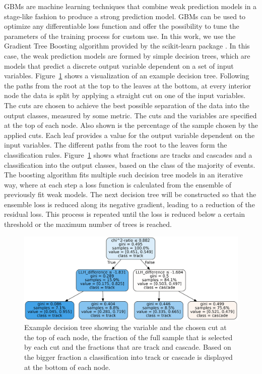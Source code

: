 GBMs are machine learning techniques that combine weak prediction models in a stage-like fashion to produce a strong prediction model.
GBMs can be used to optimize any differentiable loss function and offer the possibility to tune the parameters of the training process for custom use.
In this work, we use the Gradient Tree Boosting algorithm provided by the scikit-learn package \cite{scikit-learn}.
In this case, the weak prediction models are formed by simple decision trees, which are models that predict a discrete output variable dependent on a set of input variables.
Figure~\ref{fig:example_decision_tree} shows a visualization of an example decision tree.
Following the paths from the root at the top to the leaves at the bottom, at every interior node the data is split by applying a straight cut on one of the input variables.
The cuts are chosen to achieve the best possible separation of the data into the output classes, measured by some metric.
The cuts and the variables are specified at the top of each node.
Also shown is the percentage of the sample chosen by the applied cuts.
Each leaf provides a value for the output variable dependent on the input variables.
The different paths from the root to the leaves form the classification rules.
Figure~\ref{fig:example_decision_tree} shows what fractions are tracks and cascades and a classification into the output classes, based on the class of the majority of events.
The boosting algorithm fits multiple such decision tree models in an iterative way, where at each step a loss function is calculated from the ensemble of previously fit weak models.
The next decision tree will be constructed so that the ensemble loss is reduced along its negative gradient, leading to a reduction of the residual loss.
This process is repeated until the loss is reduced below a certain threshold or the maximum number of trees is reached.

\begin{figure}[h]
    \centering
    \includegraphics[align=b, trim = 00 00 00 00, clip, width=0.95\linewidth]{figures/example_tree.png}
    \caption[Example decision tree]{Example decision tree showing the variable and the chosen cut at the top of each node, the fraction of the full sample that is selected by each cut and the fractions that are track and cascade. Based on the bigger fraction a classification into track or cascade is displayed at the bottom of each node.}
    \label{fig:example_decision_tree}
\end{figure}


